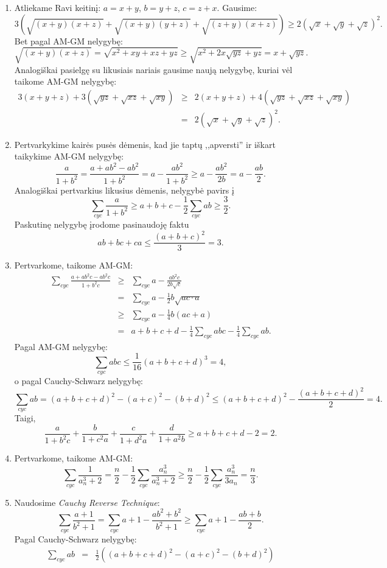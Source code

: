 \begin{enumerate}
\item 
Atliekame Ravi keitinį: $a=x+y$, $b=y+z$, $c=z+x$. Gausime:
$$3\left(\sqrt{(x+y)(x+z)}+\sqrt{(x+y)(y+z)}+\sqrt{(z+y)(x+z)}\right)\geq2\left(\sqrt{x}+\sqrt{y}+\sqrt{z}\right)^2.$$
Bet pagal AM-GM nelygybę:
$$\sqrt{(x+y)(x+z)}=\sqrt{x^2+xy+xz+yz}\geq\sqrt{x^2+2x\sqrt{yz}+yz}=x+\sqrt{yz}.$$
Analogiškai pasielgę su likusiais nariais gausime naują nelygybę,
kuriai vėl taikome AM-GM nelygybę:
\begin{eqnarray*}3(x+y+z)+3(\sqrt{yz}+\sqrt{xz}+\sqrt{xy})&\geq&2(x+y+z)+4(\sqrt{yz}+\sqrt{xz}+\sqrt{xy})\\
&=&2\left(\sqrt{x}+\sqrt{y}+\sqrt{z}\right)^2.\end{eqnarray*}
\item 
Pertvarkykime kairės pusės dėmenis, kad jie taptų ,,apversti'' ir
iškart taikykime AM-GM nelygybę:
$$\frac{a}{1+b^2}=\frac{a+ab^2-ab^2}{1+b^2}=a-\frac{ab^2}{1+b^2}\geq
a-\frac{ab^2}{2b}=a-\frac{ab}{2}.$$ Analogiškai pertvarkius likusius
dėmenis, nelygybė pavirs į $$\sum_{cyc}{\frac{a}{1+b^2}}\geq
a+b+c-\frac{1}{2}\sum_{cyc}{ab}\geq\frac{3}{2}.$$ Paskutinę nelygybę
įrodome pasinaudoję faktu $$ab+bc+ca\leq\frac{(a+b+c)^2}{3}=3.$$
\item 
Pertvarkome, taikome AM-GM: \begin{eqnarray*}
\sum_{cyc}{\frac{a+ab^2c-ab^2c}{1+b^2c}}&\geq&\sum_{cyc}{a-\frac{ab^2c}{2b\sqrt{c}}}\\
&=&\sum_{cyc}{a-\frac{1}{2}b\sqrt{ac\cdot a}}\\
&\geq&\sum_{cyc}{a-\frac{1}{4}b(ac+a)}\\&=&a+b+c+d-\frac{1}{4}\sum_{cyc}{abc}-\frac{1}{4}\sum_{cyc}{ab}.\end{eqnarray*}
Pagal AM-GM nelygybę: $$\sum_{cyc}{abc}\leq\frac{1}{16}(a+b+c+d)^3=4,$$ o pagal
Cauchy-Schwarz nelygybę:
$$\sum_{cyc}{ab}=(a+b+c+d)^2-(a+c)^2-(b+d)^2\leq(a+b+c+d)^2-\frac{(a+b+c+d)^2}{2}=4.$$
Taigi,
$$\frac{a}{1+b^2c}+\frac{b}{1+c^2a}+\frac{c}{1+d^2a}+\frac{d}{1+a^2b}\geq
a+b+c+d-2=2.$$
\item 
Pertvarkome, taikome AM-GM:
$$\sum_{cyc}{\frac{1}{a_n^3+2}}=\frac{n}{2}-\frac{1}{2}\sum_{cyc}{\frac{a_n^3}{a_n^3+2}}
\geq\frac{n}{2}-\frac{1}{2}\sum_{cyc}{\frac{a_n^3}{3a_n}}=\frac{n}{3}.$$
\item 
Naudosime \textit{Cauchy Reverse Technique}:
$$\sum_{cyc}{\frac{a+1}{b^2+1}}=\sum_{cyc}{a+1-\frac{ab^2+b^2}{b^2+1}}\geq\sum_{cyc}{a+1-\frac{ab+b}{2}}.$$
Pagal Cauchy-Schwarz nelygybę:
\begin{eqnarray*}\sum_{cyc}{ab}&=&\frac{1}{2}((a+b+c+d)^2-(a+c)^2-(b+d)^2)\\

\end{eqnarray*}
\end{enumerate}
